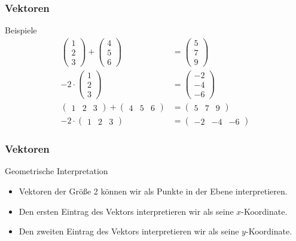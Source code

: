\documentclass{beamer}
\renewcommand{\oe}{\"o}
\newcommand{\mytitle}{Vektoren}
\begin{document}
\begin{frame}\frametitle{\mytitle}
	\begin{block}{Beispiele}
	\begin{align*}
		\begin{pmatrix}1\\2\\3\end{pmatrix}+\begin{pmatrix}4\\5\\6\end{pmatrix}&=\begin{pmatrix}5\\7\\9\end{pmatrix}\\
		-2\cdot\begin{pmatrix}1\\2\\3\end{pmatrix}&=\begin{pmatrix}-2\\-4\\-6\end{pmatrix}\\
		\begin{pmatrix}1&2&3\end{pmatrix}+\begin{pmatrix}4&5&6\end{pmatrix}&=\begin{pmatrix}5&7&9\end{pmatrix}\\
		-2\cdot\begin{pmatrix}1&2&3\end{pmatrix}&=\begin{pmatrix}-2&-4&-6\end{pmatrix}
	\end{align*}
	\end{block}
\end{frame}

\begin{frame}\frametitle{\mytitle}
	\begin{block}{Geometrische Interpretation}
	\begin{itemize}
		\item Vektoren der Gr\oe\ss e 2 k\oe nnen wir als Punkte in der Ebene interpretieren.
		\item Den ersten Eintrag des Vektors interpretieren wir als seine $x$-Koordinate.
		\item Den zweiten Eintrag des Vektors interpretieren wir als seine $y$-Koordinate.
	\end{itemize}
	\end{block}
\end{frame}
\end{document}

